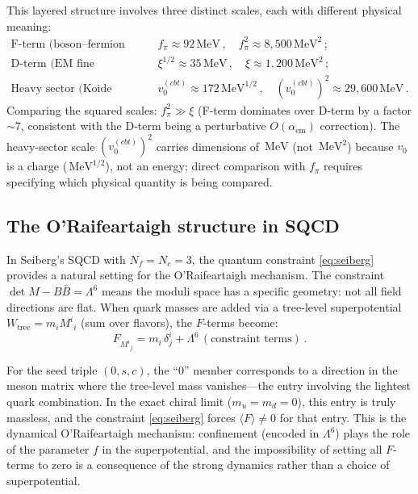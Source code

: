 \documentclass[12pt,a4paper]{article}
\newcommand{\MeV}{\,\text{MeV}}
\begin{document}
This layered structure involves three distinct scales, each with 
different physical meaning:
\begin{align}
\text{F-term (boson--fermion splitting):} &\quad 
f_\pi \approx 92\MeV\,, \quad f_\pi^2 \approx 8{,}500\MeV^2\,; \\
\text{D-term (EM fine structure):} &\quad 
\xi^{1/2} \approx 35\MeV\,, \quad \xi \approx 1{,}200\MeV^2\,; \\
\text{Heavy sector (Koide scale):} &\quad 
v_0^{(cbt)} \approx 172\MeV^{1/2}\,, \quad (v_0^{(cbt)})^2 \approx 29{,}600\MeV\,.
\end{align}
Comparing the squared scales: $f_\pi^2 \gg \xi$ (F-term dominates 
over D-term by a factor $\sim 7$, consistent with the D-term being 
a perturbative $O(\alpha_{\text{em}})$ correction). The heavy-sector 
scale $(v_0^{(cbt)})^2$ carries dimensions of $\MeV$ (not $\MeV^2$) 
because $v_0$ is a charge ($\MeV^{1/2}$), not an energy; direct 
comparison with $f_\pi$ requires specifying which physical quantity 
is being compared.

\subsection{The O'Raifeartaigh structure in SQCD}

In Seiberg's SQCD with $N_f = N_c = 3$, the quantum constraint 
\eqref{eq:seiberg} provides a natural setting for the 
O'Raifeartaigh mechanism. The constraint $\det M - B\bar{B} = \Lambda^6$ 
means the moduli space has a specific geometry: not all field directions 
are flat. When quark masses are added via a tree-level superpotential 
$W_{\text{tree}} = m_i M^i{}_i$ (sum over flavors), the $F$-terms become:
\begin{equation}
F_{M^i{}_j} = m_i\,\delta^i_j + \Lambda^6\,(\text{constraint terms})\,.
\end{equation}

For the seed triple $(0, s, c)$, the ``$0$'' member corresponds to a 
direction in the meson matrix where the tree-level mass vanishes---the 
entry involving the lightest quark combination. In the exact chiral 
limit ($m_u = m_d = 0$), this entry is truly massless, and the 
constraint \eqref{eq:seiberg} forces $\langle F\rangle \neq 0$ for 
that entry. This is the dynamical O'Raifeartaigh mechanism: 
confinement (encoded in $\Lambda^6$) plays the role of the parameter 
$f$ in the superpotential, and the impossibility of setting all 
$F$-terms to zero is a consequence of the strong dynamics rather 
than a choice of superpotential.
\end{document}
